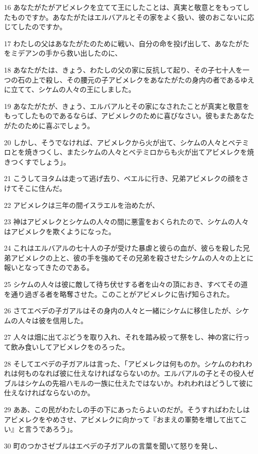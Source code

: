 \par 16 あなたがたがアビメレクを立てて王にしたことは、真実と敬意とをもってしたものですか。あなたがたはエルバアルとその家をよく扱い、彼のおこないに応じてしたのですか。
\par 17 わたしの父はあなたがたのために戦い、自分の命を投げ出して、あなたがたをミデアンの手から救い出したのに、
\par 18 あなたがたは、きょう、わたしの父の家に反抗して起り、その子七十人を一つの石の上で殺し、その腰元の子アビメレクをあなたがたの身内の者であるゆえに立てて、シケムの人々の王にしました。
\par 19 あなたがたが、きょう、エルバアルとその家になされたことが真実と敬意をもってしたものであるならば、アビメレクのために喜びなさい。彼もまたあなたがたのために喜ぶでしょう。
\par 20 しかし、そうでなければ、アビメレクから火が出て、シケムの人々とベテミロとを焼きつくし、またシケムの人々とベテミロからも火が出てアビメレクを焼きつくすでしょう」。
\par 21 こうしてヨタムは走って逃げ去り、ベエルに行き、兄弟アビメレクの顔をさけてそこに住んだ。
\par 22 アビメレクは三年の間イスラエルを治めたが、
\par 23 神はアビメレクとシケムの人々の間に悪霊をおくられたので、シケムの人々はアビメレクを欺くようになった。
\par 24 これはエルバアルの七十人の子が受けた暴虐と彼らの血が、彼らを殺した兄弟アビメレクの上と、彼の手を強めてその兄弟を殺させたシケムの人々の上とに報いとなってきたのである。
\par 25 シケムの人々は彼に敵して待ち伏せする者を山々の頂におき、すべてその道を通り過ぎる者を略奪させた。このことがアビメレクに告げ知らされた。
\par 26 さてエベデの子ガアルはその身内の人々と一緒にシケムに移住したが、シケムの人々は彼を信用した。
\par 27 人々は畑に出てぶどうを取り入れ、それを踏み絞って祭をし、神の宮に行って飲み食いしてアビメレクをのろった。
\par 28 そしてエベデの子ガアルは言った、「アビメレクは何ものか。シケムのわれわれは何ものなれば彼に仕えなければならないのか。エルバアルの子とその役人ゼブルはシケムの先祖ハモルの一族に仕えたではないか。われわれはどうして彼に仕えなければならないのか。
\par 29 ああ、この民がわたしの手の下にあったらよいのだが。そうすればわたしはアビメレクをやめさせ、アビメレクに向かって『おまえの軍勢を増して出てこい』と言うであろう」。
\par 30 町のつかさゼブルはエベデの子ガアルの言葉を聞いて怒りを発し、
